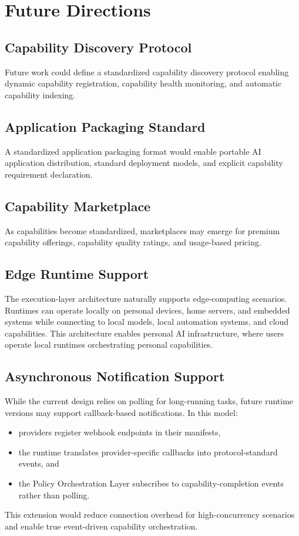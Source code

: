 \section{Future Directions}

\subsection{Capability Discovery Protocol}

Future work could define a standardized capability discovery protocol enabling dynamic capability registration, capability health monitoring, and automatic capability indexing.

\subsection{Application Packaging Standard}

A standardized application packaging format would enable portable AI application distribution, standard deployment models, and explicit capability requirement declaration.

\subsection{Capability Marketplace}

As capabilities become standardized, marketplaces may emerge for premium capability offerings, capability quality ratings, and usage-based pricing.

\subsection{Edge Runtime Support}

The execution-layer architecture naturally supports edge-computing scenarios. Runtimes can operate locally on personal devices, home servers, and embedded systems while connecting to local models, local automation systems, and cloud capabilities. This architecture enables personal AI infrastructure, where users operate local runtimes orchestrating personal capabilities.

\subsection{Asynchronous Notification Support}

While the current design relies on polling for long-running tasks, future runtime versions may support callback-based notifications. In this model:
\begin{itemize}[leftmargin=*,nosep]
  \item providers register webhook endpoints in their manifests,
  \item the runtime translates provider-specific callbacks into protocol-standard events, and
  \item the Policy Orchestration Layer subscribes to capability-completion events rather than polling.
\end{itemize}

This extension would reduce connection overhead for high-concurrency scenarios and enable true event-driven capability orchestration.
